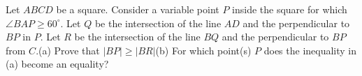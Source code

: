 Let $ABCD$ be a square. Consider a variable point $P$ inside the square for which $\angle BAP \ge 60^\circ.$ Let $Q$ be the intersection of the line $AD$ and the perpendicular to $BP$ in $P$. Let $R$ be the intersection of the line $BQ$ and the perpendicular to $BP$ from $C$.(a) Prove that $|BP|\ge |BR|$(b) For which point(s) $P$ does the inequality in (a) become an equality?